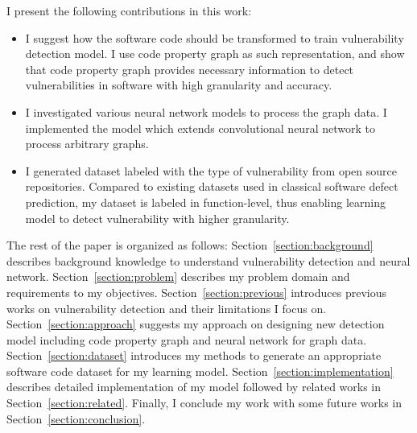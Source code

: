 I present the following contributions in this work:
\begin{itemize}
\item
I suggest how the software code should be transformed to train vulnerability detection model.
I use code property graph as such representation, and show that code property graph provides necessary information to detect vulnerabilities in software with high granularity and accuracy.
\item
I investigated various neural network models to process the graph data.
I implemented the model which extends convolutional neural network to process arbitrary graphs.
\item
I generated dataset labeled with the type of vulnerability from open source repositories.
Compared to existing datasets used in classical software defect prediction, my dataset is labeled in function-level,
thus enabling learning model to detect vulnerability with higher granularity.
\end{itemize}

The rest of the paper is organized as follows:
Section~\ref{section:background} describes background knowledge to understand vulnerability detection and neural network.
Section~\ref{section:problem} describes my problem domain and requirements to my objectives.
Section~\ref{section:previous} introduces previous works on vulnerability detection and their limitations I focus on.
Section~\ref{section:approach} suggests my approach on designing new detection model including code property graph and neural network for graph data.
Section~\ref{section:dataset} introduces my methods to generate an appropriate software code dataset for my learning model.
Section~\ref{section:implementation} describes detailed implementation of my model followed by related works in Section~\ref{section:related}.
Finally, I conclude my work with some future works in Section~\ref{section:conclusion}.